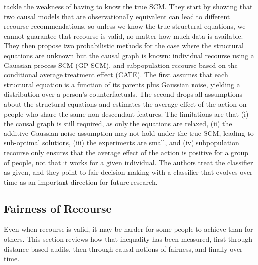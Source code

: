 \citet{karimi2020algorithmic} tackle the weakness of having to know the true SCM. They start by showing
that two causal models that are observationally equivalent can lead to different recourse
recommendations, so unless we know the true structural equations, we cannot guarantee that recourse is
valid, no matter how much data is available. They then propose two probabilistic methods for the case
where the structural equations are unknown but the causal graph is known: individual recourse using a
Gaussian process SCM (GP-SCM), and subpopulation recourse based on the conditional average treatment
effect (CATE). The first assumes that each structural equation is a function of its parents plus Gaussian
noise, yielding a distribution over a person's counterfactuals. The second drops all assumptions about
the structural equations and estimates the average effect of the action on people who share the same
non-descendant features. The limitations are that (i) the causal graph is still required, as only the
equations are relaxed, (ii) the additive Gaussian noise assumption may not hold under the true SCM,
leading to sub-optimal solutions, (iii) the experiments are small, and (iv) subpopulation recourse only
ensures that the average effect of the action is positive for a group of people, not that it works for
a given individual. The authors treat the classifier as given, and they point to fair decision making
with a classifier that evolves over time as an important direction for future research.

\subsection{Fairness of Recourse}
\label{sec:lr-fair-recourse}
Even when recourse is valid, it may be harder for some people to achieve than for others. This section
reviews how that inequality has been measured, first through distance-based audits, then through causal
notions of fairness, and finally over time.

